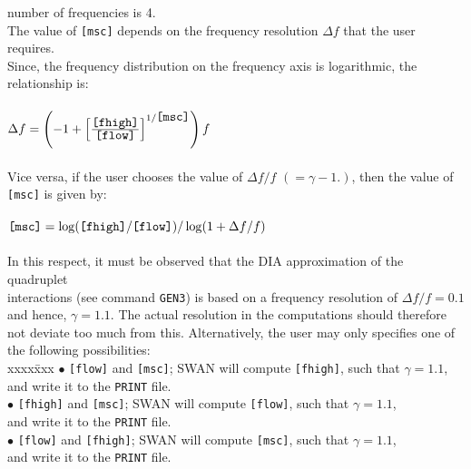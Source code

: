 \documentclass[12pt]{book}
\begin{document}
\begin{tabbing}
                     number of frequencies is 4.\\
                     The value of {\tt [msc]} depends on the frequency resolution $\Delta f$ that the user requires.\\
                     Since, the frequency distribution on the frequency axis is logarithmic, the\\
                     relationship is:\\
                     \\
                     $\Delta f = \left( -1 + \left[ {\frac{\mbox{\tt [fhigh]}}{\mbox{\tt [flow]}}} \right] ^{1/{\mbox{\tt [msc]}}} \right)f$\\
                     \\
                     Vice versa, if the user chooses the value of $\Delta f/f \,\,(=\gamma-1.)$, then the value of\\
                     {\tt [msc]} is given by:\\
                     \\
                     $\mbox{\tt [msc]} = \log (\mbox{\tt [fhigh]}/\mbox{\tt [flow]})/\log (1+\Delta f/f)$\\
                     \\
                     In this respect, it must be observed that the DIA approximation of the quadruplet\\
                     interactions (see command {\tt GEN3}) is based on a frequency resolution of $\Delta f/f = 0.1$\\
                     and hence, $\gamma = 1.1$. The actual resolution in the computations should therefore\\
                     not deviate too much from this. Alternatively, the user may only specifies one of\\
                     the following possibilities:\\
                     \pushtabs
                     xxxx\=xxx \kill
                     {$\bullet$} \> {\tt [flow]} and {\tt [msc]}; SWAN will compute {\tt [fhigh]}, such that $\gamma=1.1$,\+\\
                                    and write it to the {\tt PRINT} file.\-\\
                     {$\bullet$} \> {\tt [fhigh]} and {\tt [msc]}; SWAN will compute {\tt [flow]}, such that $\gamma=1.1$,\+\\
                                    and write it to the {\tt PRINT} file.\-\\
                     {$\bullet$} \> {\tt [flow]} and {\tt [fhigh]}; SWAN will compute {\tt [msc]}, such that $\gamma=1.1$,\+\\
                                    and write it to the {\tt PRINT} file.\-\\
                     \poptabs
\end{tabbing}
\end{document}
